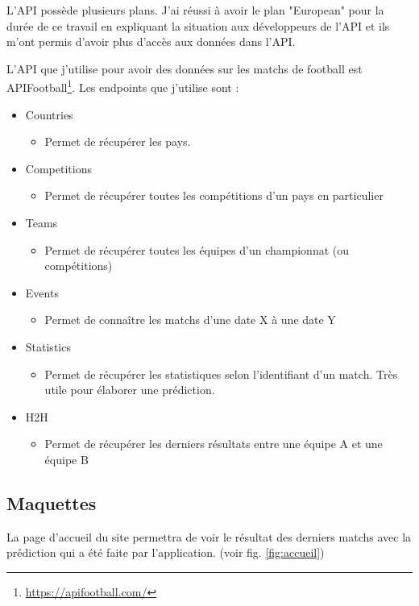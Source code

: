 \documentclass[a4paper,14pt]{extarticle}
\begin{document}
{L'API possède plusieurs plans. J'ai réussi à avoir le plan "European" pour la durée de ce travail en expliquant la situation aux développeurs de l'API et ils m'ont permis d'avoir plus d'accès aux données dans l'API.

L'API que j'utilise pour avoir des données sur les matchs de football est APIFootball\footnote{\url{https://apifootball.com/}}. Les endpoints que j'utilise sont : 
\begin{itemize}
    \item Countries
    \begin{itemize}
        \item Permet de récupérer les pays. 
    \end{itemize}
    \item Competitions
    \begin{itemize}
        \item Permet de récupérer toutes les compétitions d'un pays en particulier
    \end{itemize}
    \item Teams
    \begin{itemize}
        \item Permet de récupérer toutes les équipes d'un championnat (ou compétitions)
    \end{itemize}
    \item Events
    \begin{itemize}
        \item Permet de connaître les matchs d'une date X à une date Y
    \end{itemize}
    \item Statistics
    \begin{itemize}
        \item Permet de récupérer les statistiques selon l'identifiant d'un match. Très utile pour élaborer une prédiction.
    \end{itemize}
    \item H2H 
    \begin{itemize}
        \item Permet de récupérer les derniers résultats entre une équipe A et une équipe B
    \end{itemize}
\end{itemize}

\subsection{Maquettes}
La page d'accueil du site permettra de voir le résultat des derniers matchs avec la prédiction qui a été faite par l'application. (voir fig. \ref{fig:accueil})

}
\end{document}
